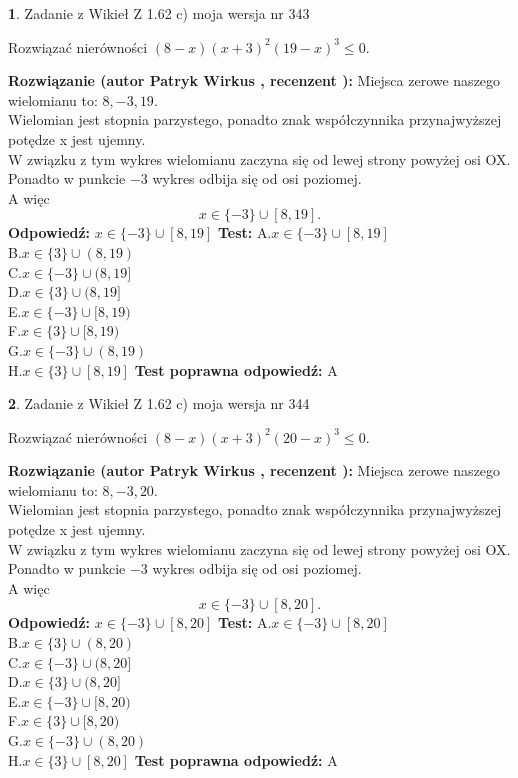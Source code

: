 \documentclass[12pt, a4paper]{article}
\theoremstyle{definition} %
\newtheorem{zad}{}
\newcommand{\zadStart}[1]{\begin{zad}#1\newline}
\newcommand{\zadStop}{\end{zad}}
\newcommand{\rozwStart}[2]{\noindent \textbf{Rozwiązanie (autor #1 , recenzent #2): }\newline}
\newcommand{\rozwStop}{\newline}
\newcommand{\odpStart}{\noindent \textbf{Odpowiedź:}\newline}
\newcommand{\odpStop}{\newline}
\newcommand{\testStart}{\noindent \textbf{Test:}\newline}
\newcommand{\testStop}{\newline}
\newcommand{\kluczStart}{\noindent \textbf{Test poprawna odpowiedź:}\newline}
\newcommand{\kluczStop}{\newline}
\begin{document}
\zadStart{Zadanie z Wikieł Z 1.62 c) moja wersja nr 343}

Rozwiązać nierówności $(8-x)(x+3)^{2}(19-x)^{3}\le0$.
\zadStop
\rozwStart{Patryk Wirkus}{}
Miejsca zerowe naszego wielomianu to: $8, -3, 19$.\\
Wielomian jest stopnia parzystego, ponadto znak współczynnika przy\linebreak najwyższej potędze x jest ujemny.\\ W związku z tym wykres wielomianu zaczyna się od lewej strony powyżej osi OX.\\
Ponadto w punkcie $-3$ wykres odbija się od osi poziomej.\\
A więc $$x \in \{-3\} \cup [8,19].$$
\rozwStop
\odpStart
$x \in \{-3\} \cup [8,19]$
\odpStop
\testStart
A.$x \in \{-3\} \cup [8,19]$\\
B.$x \in \{3\} \cup (8,19)$\\
C.$x \in \{-3\} \cup (8,19]$\\
D.$x \in \{3\} \cup (8,19]$\\
E.$x \in \{-3\} \cup [8,19)$\\
F.$x \in \{3\} \cup [8,19)$\\
G.$x \in \{-3\} \cup (8,19)$\\
H.$x \in \{3\} \cup [8,19]$
\testStop
\kluczStart
A
\kluczStop



\zadStart{Zadanie z Wikieł Z 1.62 c) moja wersja nr 344}

Rozwiązać nierówności $(8-x)(x+3)^{2}(20-x)^{3}\le0$.
\zadStop
\rozwStart{Patryk Wirkus}{}
Miejsca zerowe naszego wielomianu to: $8, -3, 20$.\\
Wielomian jest stopnia parzystego, ponadto znak współczynnika przy\linebreak najwyższej potędze x jest ujemny.\\ W związku z tym wykres wielomianu zaczyna się od lewej strony powyżej osi OX.\\
Ponadto w punkcie $-3$ wykres odbija się od osi poziomej.\\
A więc $$x \in \{-3\} \cup [8,20].$$
\rozwStop
\odpStart
$x \in \{-3\} \cup [8,20]$
\odpStop
\testStart
A.$x \in \{-3\} \cup [8,20]$\\
B.$x \in \{3\} \cup (8,20)$\\
C.$x \in \{-3\} \cup (8,20]$\\
D.$x \in \{3\} \cup (8,20]$\\
E.$x \in \{-3\} \cup [8,20)$\\
F.$x \in \{3\} \cup [8,20)$\\
G.$x \in \{-3\} \cup (8,20)$\\
H.$x \in \{3\} \cup [8,20]$
\testStop
\kluczStart
A
\kluczStop
\end{document}
